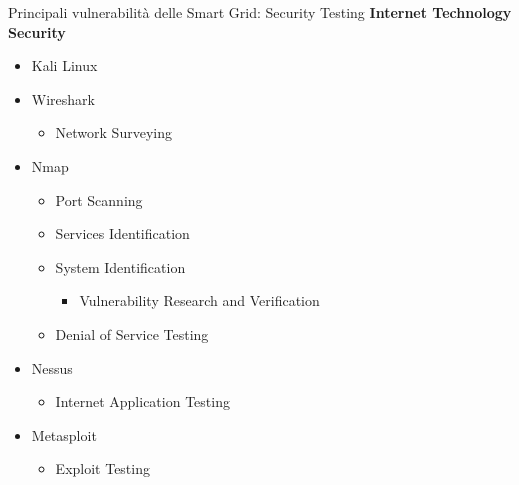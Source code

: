 \begin{frame}{Principali vulnerabilità delle Smart Grid: Security Testing}
\textbf{Internet Technology Security}
	\begin{itemize}[<+- | alert@+>]
		\item Kali Linux
		\item Wireshark
		\begin{itemize}
			\item Network Surveying
		\end{itemize}
		\item Nmap
		\begin{itemize}
			\item Port Scanning
			\item Services Identification
			\item System Identification
			\begin{itemize}
				\item Vulnerability Research and Verification
			\end{itemize}
			\item Denial of Service Testing
		\end{itemize}
		\item Nessus
		\begin{itemize}
			\item Internet Application Testing
		\end{itemize}
		\item Metasploit
		\begin{itemize}
			\item Exploit Testing
		\end{itemize}
	\end{itemize}
\end{frame}


